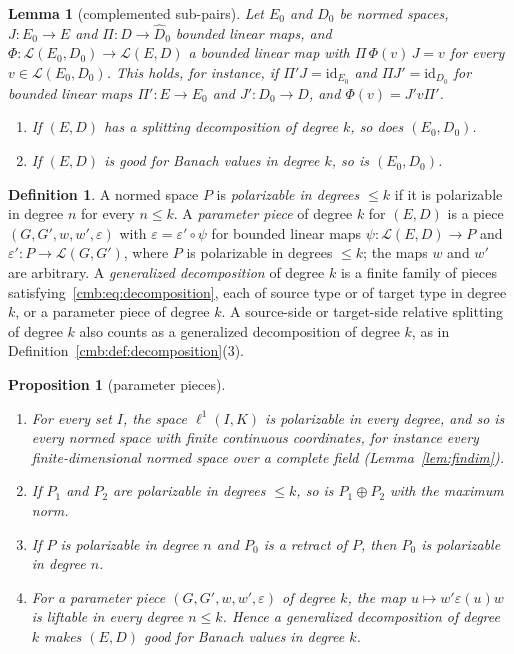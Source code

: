 \documentclass[11pt]{amsart}
\newtheorem{lemma}[theorem]{Lemma}
\newtheorem{proposition}[theorem]{Proposition}
\theoremstyle{definition}
\newtheorem{definition}[theorem]{Definition}
\theoremstyle{remark}
\numberwithin{equation}{section}
\newcommand{\cL}{\mathcal L}
\newcommand{\id}{\mathrm{id}}
\theoremstyle{plain}
\theoremstyle{definition}
\theoremstyle{plain}
\begin{document}
\begin{lemma}[complemented sub-pairs]\label{cmb:lem:subpair}
Let $E_0$ and $D_0$ be normed spaces, $J\colon E_0\to E$ and $\Pi\colon\widehat D\to\widehat D_0$ bounded linear maps,
and $\Phi\colon\cL(E_0,D_0)\to\cL(E,D)$ a bounded linear map with $\Pi\,\Phi(v)\,J=v$ for every $v\in\cL(E_0,D_0)$. This
holds, for instance, if $\Pi'J=\id_{E_0}$ and $\Pi J'=\id_{D_0}$ for bounded linear maps $\Pi'\colon E\to E_0$ and
$J'\colon D_0\to D$, and $\Phi(v)=J'v\Pi'$.
\begin{enumerate}
\item If $(E,D)$ has a splitting decomposition of degree $k$, so does $(E_0,D_0)$.
\item If $(E,D)$ is good for Banach values in degree $k$, so is $(E_0,D_0)$.
\end{enumerate}
\end{lemma}

\begin{definition}\label{cmb:def:parameter-piece}
A normed space $P$ is \emph{polarizable in degrees $\le k$} if it is polarizable in degree $n$ for every $n\le k$. A
\emph{parameter piece} of degree $k$ for $(E,D)$ is a piece $(G,G',w,w',\varepsilon)$ with $\varepsilon=\varepsilon'\circ\psi$
for bounded linear maps $\psi\colon\cL(E,D)\to P$ and $\varepsilon'\colon P\to\cL(G,G')$, where $P$ is polarizable in
degrees $\le k$; the maps $w$ and $w'$ are arbitrary. A \emph{generalized decomposition} of degree $k$ is a finite family
of pieces satisfying~\eqref{cmb:eq:decomposition}, each of source type or of target type in degree $k$, or a parameter
piece of degree $k$. A source-side or target-side relative splitting of degree $k$ also counts as a generalized
decomposition of degree $k$, as in Definition~\ref{cmb:def:decomposition}(3).
\end{definition}

\begin{proposition}[parameter pieces]\label{cmb:prop:parameter-pieces}
\begin{enumerate}
\item For every set $I$, the space $\ell^1(I,K)$ is polarizable in every degree, and so is every normed space with finite
continuous coordinates, for instance every finite-dimensional normed space over a complete field
(Lemma~\ref{lem:findim}).
\item If $P_1$ and $P_2$ are polarizable in degrees $\le k$, so is $P_1\oplus P_2$ with the maximum norm.
\item If $P$ is polarizable in degree $n$ and $P_0$ is a retract of $P$, then $P_0$ is polarizable in degree $n$.
\item For a parameter piece $(G,G',w,w',\varepsilon)$ of degree $k$, the map $u\mapsto w'\varepsilon(u)w$ is liftable in
every degree $n\le k$. Hence a generalized decomposition of degree $k$ makes $(E,D)$ good for Banach values in degree
$k$.
\end{enumerate}
\end{proposition}
\end{document}
